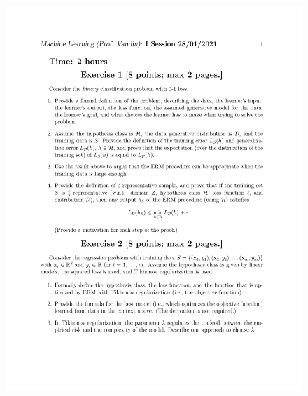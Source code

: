 \documentclass[a4paper,11pt,oneside]{book}
\begin{document}
\begin{figure}[H]
    \begin{minipage}{0.45\textwidth}
        \includegraphics[width=\textwidth,page=3]{images/28_Jan_2021.pdf}
    \end{minipage}
\end{figure}

\clearpage
\end{document}

